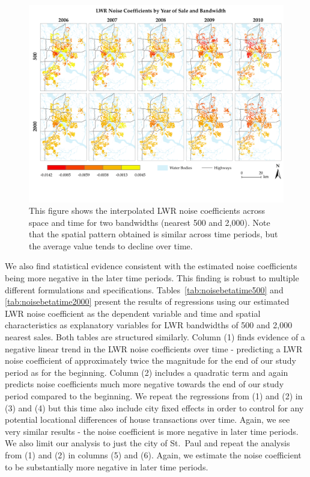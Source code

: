 \documentclass{article}\usepackage{graphicx, color}
\begin{document}
\begin{figure}
 \includegraphics[trim = 0cm 2cm 0cm 0cm, clip = true, width = \textwidth]{../graphs/Noise_50_200_ByYear}
 \caption{This figure shows the interpolated LWR noise coefficients across space and time for two bandwidths (nearest 500 and 2,000). Note that the spatial pattern obtained is similar across time periods, but the average value tends to decline over time.}
 \label{fig:NoiseTime}
\end{figure}

We also find statistical evidence consistent with the estimated noise coefficients being more negative in the later time periods. This finding is robust to multiple different formulations and specifications. Tables~\ref{tab:noisebetatime500} and \ref{tab:noisebetatime2000} present the results of regressions using our estimated LWR noise coefficient as the dependent variable and time and spatial characteristics as explanatory variables for LWR bandwidths of 500 and 2,000 nearest sales. Both tables are structured similarly. Column (1) finds evidence of a negative linear trend in the LWR noise coefficients over time - predicting a LWR noise coefficient of approximately twice the magnitude for the end of our study period as for the beginning. Column (2) includes a quadratic term and again predicts noise coefficients much more negative towards the end of our study period compared to the beginning. We repeat the regressions from (1) and (2) in (3) and (4) but this time also include city fixed effects in order to control for any potential locational differences of house transactions over time. Again, we see very similar results - the noise coefficient is more negative in later time periods. We also limit our analysis to just the city of St.\ Paul and repeat the analysis from (1) and (2) in columns (5) and (6). Again, we estimate the noise coefficient to be substantially more negative in later time periods. 
\end{document}
